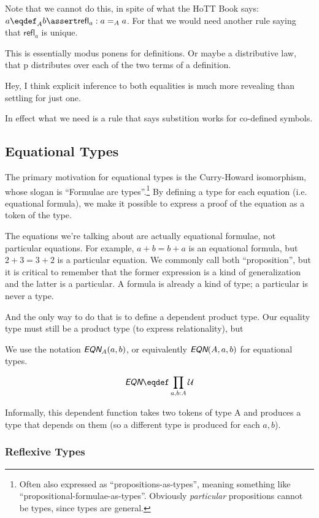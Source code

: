 \documentclass{article}
\begin{document}
Note that we cannot do this, in spite of what the HoTT Book says:
\mbox{\(a\defn_A b\linfer\textsf{refl}_a:a=_A a\)}. For that we would
need another rule saying that \(\textsf{refl}_a\) is unique.

This is essentially modus ponens for definitions. Or maybe a
distributive law, that p distributes over each of the two terms of a
definition.

Hey, I think explicit inference to both equalities is much more
revealing than settling for just one.

In effect what we need is a rule that says substition works for
co-defined symbols.

\subsection{Equational Types}

The primary motivation for equational types is the Curry-Howard
isomorphism, whose slogan is ``Formulae are types''.\footnote{Often
also expressed as ``propositions-as-types'', meaning something like
``propositional-formulae-as-types''. Obviously \textit{particular}
propositions cannot be types, since types are general.} By defining a
type for each equation (i.e. equational formula), we make it possible
to express a proof of the equation as a token of the type.

The equations we're talking about are actually equational formulae,
not particular equations. For example, \(a+b=b+a\) is an equational
formula, but \(2+3=3+2\) is a particular equation. We commonly call
both ``proposition'', but it is critical to remember that the former
expression is a kind of generalization and the latter is a particular.
A formula is already a kind of type; a particular is never a type.


And the only way to do that is to define a dependent product type. Our
equality type must still be a product type (to express relationality),
but

We use the notation \(\EQN_A(a,b)\), or equivalently \(\EQN(A,a,b)\)
for equational types.

\[\EQN \defn \prod\limits_{\tjsmall{a,b}{A}}\Univ\]



Informally, this dependent function takes two tokens of type A and
produces a type that depends on them (so a different type is produced
for each \(a,b\)).

\subsubsection{Reflexive Types}
\end{document}
